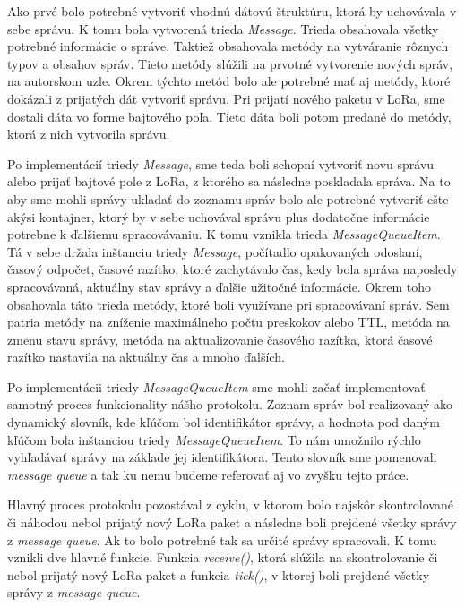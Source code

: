 \documentclass[slovak,master]{diploma}
\begin{document}
Ako prvé bolo potrebné vytvoriť vhodnú dátovú štruktúru, ktorá by uchovávala v sebe správu. K tomu bola vytvorená trieda \emph{Message}. Trieda obsahovala všetky potrebné informácie o správe. 
Taktiež obsahovala metódy na vytváranie rôznych typov a obsahov správ. Tieto metódy slúžili na prvotné vytvorenie nových správ, na autorskom uzle. Okrem týchto metód bolo 
ale potrebné mať aj metódy, ktoré dokázali z prijatých dát vytvoriť správu. Pri prijatí nového paketu v LoRa, sme dostali dáta vo forme bajtového poľa. Tieto dáta boli potom predané 
do metódy, ktorá z nich vytvorila správu.

Po implementácií triedy \emph{Message}, sme teda boli schopní vytvoriť novu správu alebo prijať bajtové pole z LoRa, z ktorého sa následne poskladala správa. Na to aby sme 
mohli správy ukladať do zoznamu správ bolo ale potrebné vytvoriť ešte akýsi kontajner, ktorý by v sebe uchovával správu plus dodatočne informácie potrebne k ďalšiemu spracovávaniu.
K tomu vznikla trieda \emph{MessageQueueItem}. Tá v sebe držala inštanciu triedy \emph{Message}, počítadlo opakovaných odoslaní, časový odpočet, časové razítko, ktoré zachytávalo čas, kedy bola 
správa naposledy spracovávaná, aktuálny stav správy a ďalšie užitočné informácie. Okrem toho obsahovala táto trieda metódy, ktoré boli využívane pri spracovávaní správ. Sem patria metódy na zníženie maximálneho počtu preskokov alebo 
TTL, metóda na zmenu stavu správy, metóda na aktualizovanie časového razítka, ktorá časové razítko nastavila na aktuálny čas a mnoho ďalších.

Po implementácii triedy \emph{MessageQueueItem} sme mohli začať implementovať samotný proces funkcionality nášho protokolu. Zoznam správ bol realizovaný ako dynamický slovník, 
kde kľúčom bol identifikátor správy, a hodnota pod daným kľúčom bola inštanciou triedy \emph{MessageQueueItem}. To nám umožnilo rýchlo vyhľadávať správy na základe jej identifikátora. 
Tento slovník sme pomenovali \emph{message queue} a tak ku nemu budeme referovať aj vo zvyšku tejto práce.

Hlavný proces protokolu pozostával z cyklu, v ktorom bolo najskôr skontrolované či náhodou nebol prijatý nový LoRa paket a následne boli prejdené všetky správy z \emph{message queue}. Ak to bolo 
potrebné tak sa určité správy spracovali. K tomu vznikli dve hlavné funkcie. Funkcia \emph{receive()}, ktorá slúžila na skontrolovanie či nebol prijatý nový LoRa paket a funkcia \emph{tick()}, v ktorej boli prejdené všetky správy z \emph{message queue}.
\end{document}
